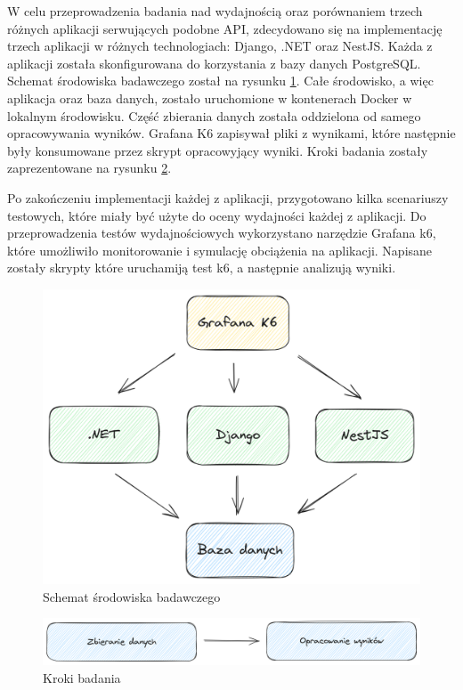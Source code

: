 W celu przeprowadzenia badania nad wydajnością oraz porównaniem trzech różnych aplikacji serwujących podobne API, zdecydowano się na implementację trzech aplikacji w różnych technologiach: Django, .NET oraz NestJS.
Każda z aplikacji została skonfigurowana do korzystania z bazy danych PostgreSQL. Schemat środowiska badawczego został na rysunku \ref{rys:docker_schema}.
Całe środowisko, a więc aplikacja oraz baza danych, zostało uruchomione w kontenerach Docker w lokalnym środowisku.
Część zbierania danych została oddzielona od samego opracowywania wyników.
Grafana K6 zapisywał pliki z wynikami, które następnie były konsumowane przez skrypt opracowyjący wyniki. Kroki badania zostały zaprezentowane na rysunku \ref{rys:test_flow}.

Po zakończeniu implementacji każdej z aplikacji, przygotowano kilka scenariuszy testowych, które miały być użyte do oceny wydajności każdej z aplikacji.
Do przeprowadzenia testów wydajnościowych wykorzystano narzędzie Grafana k6, które umożliwiło monitorowanie i symulację obciążenia na aplikacji.
Napisane zostały skrypty które uruchamiją test k6, a następnie analizują wyniki.

\begin{figure}[!hb]
	\centering \includegraphics[width=1\linewidth]{rysunki/framework_benchmark_schema.png}
	\caption{Schemat środowiska badawczego}
	\label{rys:docker_schema}
\end{figure}

\begin{figure}[!hb]
	\centering \includegraphics[width=1\linewidth]{rysunki/test_flow.png}
	\caption{Kroki badania}
	\label{rys:test_flow}
\end{figure}